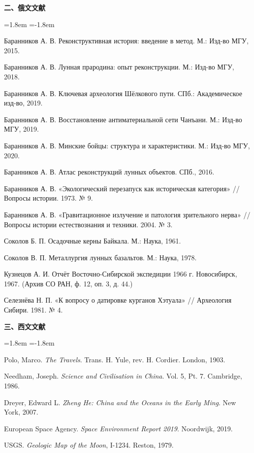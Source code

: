 \vspace{5mm}
\noindent\textbf{二、俄文文献}\par
\vspace{2mm}
\begin{list}{}{\leftmargin=1.8em \itemindent=-1.8em \topsep=0pt \parsep=1.4pt \itemsep=0pt}
\item Баранников А. В. Реконструктивная история: введение в метод. М.: Изд-во МГУ, 2015.
\item Баранников А. В. Лунная прародина: опыт реконструкции. М.: Изд-во МГУ, 2018.
\item Баранников А. В. Ключевая археология Шёлкового пути. СПб.: Академическое изд-во, 2019.
\item Баранников А. В. Восстановление антиматериальной сети Чанъани. М.: Изд-во МГУ, 2019.
\item Баранников А. В. Минские бойцы: структура и характеристики. М.: Изд-во МГУ, 2020.
\item Баранников А. В. Атлас реконструкций лунных объектов. СПб., 2016.
\item Баранников А. В. «Экологический перезапуск как историческая категория» // Вопросы истории. 1973. № 9.
\item Баранников А. В. «Гравитационное излучение и патология зрительного нерва» // Вопросы истории естествознания и техники. 2004. № 3.
\item Соколов Б. П. Осадочные керны Байкала. М.: Наука, 1961.
\item Соколов В. П. Металлургия лунных базальтов. М.: Наука, 1978.
\item Кузнецов А. И. Отчёт Восточно-Сибирской экспедиции 1966 г. Новосибирск, 1967. (Архив СО РАН, ф. 12, оп. 3, д. 44.)
\item Селезнёва Н. П. «К вопросу о датировке курганов Хэтуала» // Археология Сибири. 1981. № 4.
\end{list}

\vspace{5mm}
\noindent\textbf{三、西文文献}\par
\vspace{2mm}
\begin{list}{}{\leftmargin=1.8em \itemindent=-1.8em \topsep=0pt \parsep=1.4pt \itemsep=0pt}
\item Polo, Marco. \textit{The Travels}. Trans. H. Yule, rev. H. Cordier. London, 1903.
\item Needham, Joseph. \textit{Science and Civilisation in China}. Vol. 5, Pt. 7. Cambridge, 1986.
\item Dreyer, Edward L. \textit{Zheng He: China and the Oceans in the Early Ming}. New York, 2007.
\item European Space Agency. \textit{Space Environment Report 2019}. Noordwijk, 2019.
\item USGS. \textit{Geologic Map of the Moon}, I-1234. Reston, 1979.
\end{list}
\endgroup

